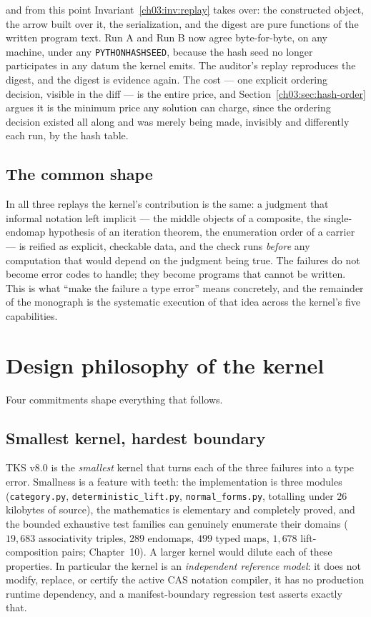 and from this point Invariant~\ref{ch03:inv:replay} takes over: the
constructed object, the arrow built over it, the serialization, and the
digest are pure functions of the written program text. Run A and Run B
now agree byte-for-byte, on any machine, under any
\texttt{PYTHONHASHSEED}, because the hash seed no longer participates in
any datum the kernel emits. The auditor's replay reproduces the digest,
and the digest is evidence again. The cost --- one explicit ordering
decision, visible in the diff --- is the entire price, and
Section~\ref{ch03:sec:hash-order} argues it is the minimum price any
solution can charge, since the ordering decision existed all along and
was merely being made, invisibly and differently each run, by the hash
table.

\subsection{The common shape}

In all three replays the kernel's contribution is the same: a judgment
that informal notation left implicit --- the middle objects of a
composite, the single-endomap hypothesis of an iteration theorem, the
enumeration order of a carrier --- is reified as explicit, checkable
data, and the check runs \emph{before} any computation that would depend
on the judgment being true. The failures do not become error codes to
handle; they become programs that cannot be written. This is what
``make the failure a type error'' means concretely, and the remainder of
the monograph is the systematic execution of that idea across the
kernel's five capabilities.

\section{Design philosophy of the kernel}\label{ch01:sec:philosophy}

Four commitments shape everything that follows.

\subsection{Smallest kernel, hardest boundary}

TKS v8.0 is the \emph{smallest} kernel that turns each of the three failures
into a type error. Smallness is a feature with teeth: the implementation is
three modules (\texttt{category.py}, \texttt{deterministic\_lift.py},
\texttt{normal\_forms.py}, totalling under 26 kilobytes of source), the
mathematics is elementary and completely proved, and the bounded exhaustive
test families can genuinely enumerate their domains ($19{,}683$
associativity triples, $289$ endomaps, $499$ typed maps, $1{,}678$
lift-composition pairs; Chapter~10). A larger kernel would dilute each of
these properties. In particular the kernel is an \emph{independent reference
model}: it does not modify, replace, or certify the active CAS notation
compiler, it has no production runtime dependency, and a manifest-boundary
regression test asserts exactly that.

